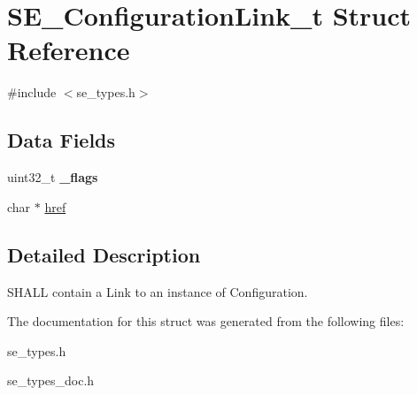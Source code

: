 \hypertarget{structSE__ConfigurationLink__t}{}\section{S\+E\+\_\+\+Configuration\+Link\+\_\+t Struct Reference}
\label{structSE__ConfigurationLink__t}


{\ttfamily \#include $<$se\+\_\+types.\+h$>$}

\subsection*{Data Fields}
\begin{DoxyCompactItemize}
\item 
uint32\+\_\+t {\bfseries \+\_\+flags}
\item 
char $\ast$ \hyperlink{group__ConfigurationLink_ga4902a2316344c9ca93cad0f7aa9ee620}{href}
\end{DoxyCompactItemize}


\subsection{Detailed Description}
S\+H\+A\+LL contain a Link to an instance of Configuration. 

The documentation for this struct was generated from the following files\+:\begin{DoxyCompactItemize}
\item 
se\+\_\+types.\+h\item 
se\+\_\+types\+\_\+doc.\+h\end{DoxyCompactItemize}
